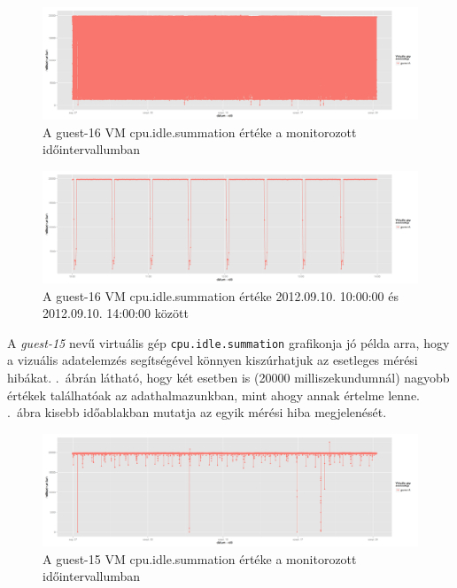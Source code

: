 \documentclass[a4paper,10pt,titlepage]{article}
\begin{document}
\begin{figure}[ht!]
\centering
\includegraphics[width=1.00\textwidth]{figures/cpu_idle_summation-guest-16-20120826230140-20120924083120.png}
\caption{A guest-16 VM cpu.idle.summation értéke a monitorozott időintervallumban \label{fig:cpu_idle_summation_g16_1}}
\end{figure}

\begin{figure}[ht!]
\centering
\includegraphics[width=1.00\textwidth]{figures/cpu_idle_summation-guest-16-20120910100000-20120910140000.png}
\caption{A guest-16 VM cpu.idle.summation értéke 2012.09.10. 10:00:00 és 2012.09.10. 14:00:00 között \label{fig:cpu_idle_summation_g16_2}}
\end{figure}

A \textit{guest-15} nevű virtuális gép \texttt{cpu.idle.summation} grafikonja jó példa arra, hogy a vizuális adatelemzés segítségével könnyen kiszúrhatjuk az esetleges mérési hibákat. .~ábrán látható, hogy két esetben is (20000 milliszekundumnál) nagyobb értékek találhatóak az adathalmazunkban, mint ahogy annak értelme lenne. .~ábra kisebb időablakban mutatja az egyik mérési hiba megjelenését.

\begin{figure}[ht!]
\centering
\includegraphics[width=1.00\textwidth]{figures/cpu_idle_summation-guest-15-20120826230140-20120924083120.png}
\caption{A guest-15 VM cpu.idle.summation értéke a monitorozott időintervallumban \label{fig:cpu_idle_summation_g15_1}}
\end{figure}
\end{document}

